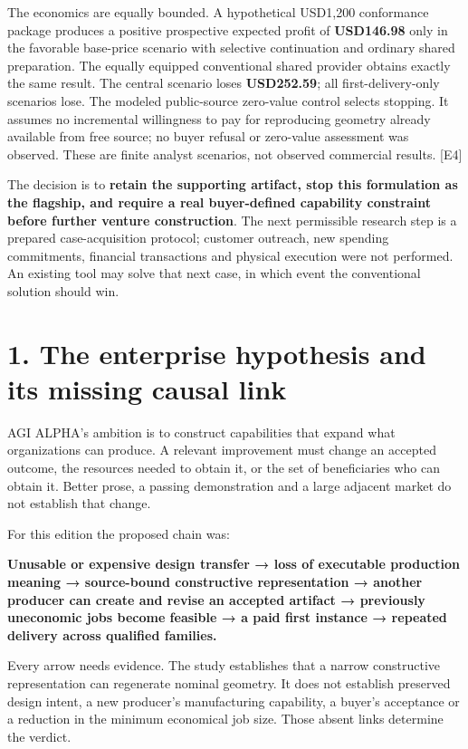 \documentclass[11pt,letterpaper]{article}
\begin{document}
The economics are equally bounded. A hypothetical USD1,200 conformance package produces a positive prospective expected profit of \textbf{USD146.98} only in the favorable base-price scenario with selective continuation and ordinary shared preparation. The equally equipped conventional shared provider obtains exactly the same result. The central scenario loses \textbf{USD252.59}; all first-delivery-only scenarios lose. The modeled public-source zero-value control selects stopping. It assumes no incremental willingness to pay for reproducing geometry already available from free source; no buyer refusal or zero-value assessment was observed. These are finite analyst scenarios, not observed commercial results. {[}E4{]}

The decision is to \textbf{retain the supporting artifact, stop this formulation as the flagship, and require a real buyer-defined capability constraint before further venture construction}. The next permissible research step is a prepared case-acquisition protocol; customer outreach, new spending commitments, financial transactions and physical execution were not performed. An existing tool may solve that next case, in which event the conventional solution should win.

\hypertarget{the-enterprise-hypothesis-and-its-missing-causal-link}{%
\section{1. The enterprise hypothesis and its missing causal link}\label{the-enterprise-hypothesis-and-its-missing-causal-link}}

AGI ALPHA's ambition is to construct capabilities that expand what organizations can produce. A relevant improvement must change an accepted outcome, the resources needed to obtain it, or the set of beneficiaries who can obtain it. Better prose, a passing demonstration and a large adjacent market do not establish that change.

For this edition the proposed chain was:

\textbf{Unusable or expensive design transfer → loss of executable production meaning → source-bound constructive representation → another producer can create and revise an accepted artifact → previously uneconomic jobs become feasible → a paid first instance → repeated delivery across qualified families.}

Every arrow needs evidence. The study establishes that a narrow constructive representation can regenerate nominal geometry. It does not establish preserved design intent, a new producer's manufacturing capability, a buyer's acceptance or a reduction in the minimum economical job size. Those absent links determine the verdict.
\end{document}
